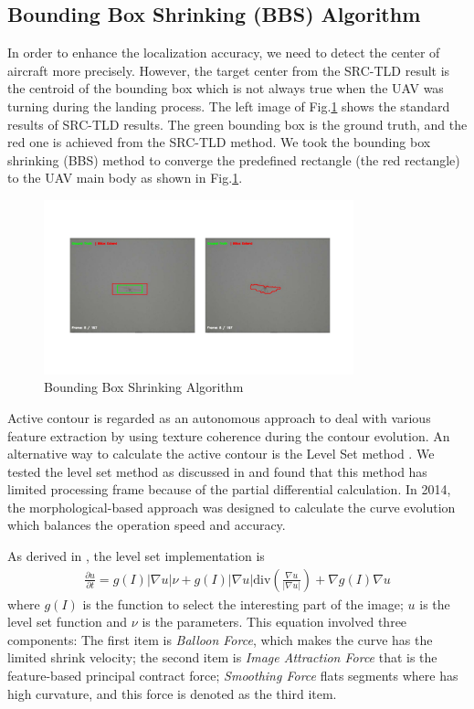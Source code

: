 \subsection{Bounding Box Shrinking (BBS) Algorithm}
In order to enhance the localization accuracy, we need to detect the center of aircraft more precisely. However, the target center from the SRC-TLD result is the centroid of the bounding box which is not always true when the UAV was turning during the landing process. The left image of Fig.\ref{fig:chp04_07_active_contour_demo} shows the standard results of SRC-TLD results. The green bounding box is the ground truth, and the red one is achieved from the SRC-TLD method. We took the bounding box shrinking (BBS) method to converge the predefined rectangle (the red rectangle) to the UAV main body as shown in Fig.\ref{fig:chp04_07_active_contour_demo}.

\begin{figure}[!th]
	\centering
	\includegraphics[width=0.8\textwidth]{Figs/chp04_07_active_contour_demo.pdf}
	\caption{Bounding Box Shrinking Algorithm}
	\label{fig:chp04_07_active_contour_demo}    
\end{figure}
Active contour is regarded as an autonomous approach to deal with various feature extraction by using texture coherence during the contour evolution. An alternative way to calculate the active contour is the Level Set method \cite{Caselles1993}. We tested the level set method as discussed in \cite{kong2013autonomous} and found that this method has limited processing frame because of the partial differential calculation. In 2014, the morphological-based approach was designed to calculate the curve evolution \cite{Marquez-Neila2014} which balances the operation speed and accuracy. 

As derived in \cite{Marquez-Neila2014}, the level set implementation is 
\begin{align}
	\frac{\partial u}{\partial t} = g(I)|\nabla u|\nu +g(I) |\nabla u|\text{div}(\frac{\nabla u}{|\nabla u|}) + \nabla g(I) \nabla u
\end{align}
where $g(I)$ is the function to select the interesting part of the image; $u$ is the level set function and $\nu$ is the parameters. This equation involved three components: The first item is \textit{Balloon Force}, which makes the curve has the limited shrink velocity; the second item is \textit{Image Attraction Force} that is the feature-based principal contract force; \textit{Smoothing Force} flats segments where has high curvature, and this force is denoted as the third item.

